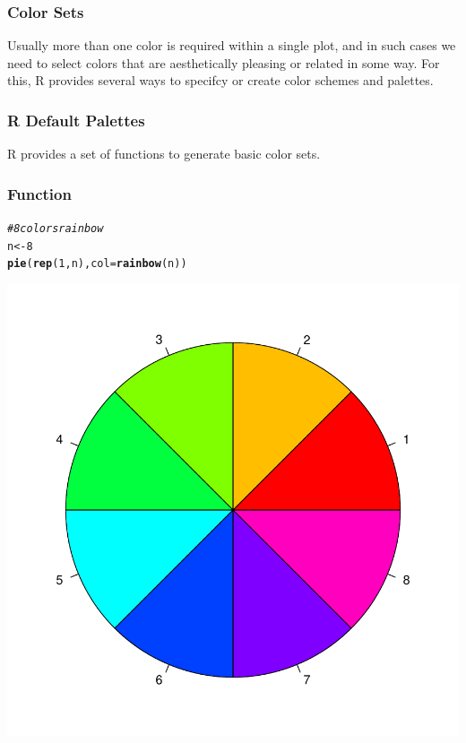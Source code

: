 \documentclass[12pt]{beamer}\usepackage[]{graphicx}\usepackage[]{color}
\makeatletter
\newcommand{\hlnum}[1]{\textcolor[rgb]{0.686,0.059,0.569}{#1}}%
\newcommand{\hlcom}[1]{\textcolor[rgb]{0.678,0.584,0.686}{\textit{#1}}}%
\newcommand{\hlstd}[1]{\textcolor[rgb]{0.345,0.345,0.345}{#1}}%
\newcommand{\hlkwb}[1]{\textcolor[rgb]{0.69,0.353,0.396}{#1}}%
\newcommand{\hlkwc}[1]{\textcolor[rgb]{0.333,0.667,0.333}{#1}}%
\newcommand{\hlkwd}[1]{\textcolor[rgb]{0.737,0.353,0.396}{\textbf{#1}}}%
\newenvironment{kframe}{%
 \def\at@end@of@kframe{}%
 \ifinner\ifhmode%
  \def\at@end@of@kframe{\end{minipage}}%
  \begin{minipage}{\columnwidth}%
 \fi\fi%
 \def\FrameCommand##1{\hskip\@totalleftmargin \hskip-\fboxsep
 \colorbox{shadecolor}{##1}\hskip-\fboxsep
     \hskip-\linewidth \hskip-\@totalleftmargin \hskip\columnwidth}%
 \MakeFramed {\advance\hsize-\width
   \@totalleftmargin\z@ \linewidth\hsize
   \@setminipage}}%
 {\par\unskip\endMakeFramed%
 \at@end@of@kframe}
\newenvironment{knitrout}{}{} %
\makeatother
\begin{document}
\begin{frame}
\frametitle{Color Sets}

Usually more than one color is required within a single plot, and in such cases we need to select colors that are aesthetically pleasing  or related in some way. For this, R provides several ways to specifcy or create color schemes and palettes.
\eb

\end{frame}


\begin{frame}
\frametitle{R Default Palettes}

R provides a set of functions to generate basic color sets.
 \bi
  \item {}
  \item {}
  \item {}
  \item {}
  \item {}
  \item {}
 \ei
\eb

\end{frame}


\begin{frame}[fragile]
\frametitle{Function }

\begin{knitrout}\scriptsize
{}\color{fgcolor}\begin{kframe}
\begin{alltt}
\hlcom{# 8 colors rainbow}
\hlstd{n} \hlkwb{<-} \hlnum{8}
\hlkwd{pie}\hlstd{(}\hlkwd{rep}\hlstd{(}\hlnum{1}\hlstd{, n),} \hlkwc{col} \hlstd{=} \hlkwd{rainbow}\hlstd{(n))}
\end{alltt}
\end{kframe}

{\centering \includegraphics[width=.4\linewidth,height=.4\linewidth]{figure/rainbow-1} 

}



\end{knitrout}

\end{frame}
\end{document}
